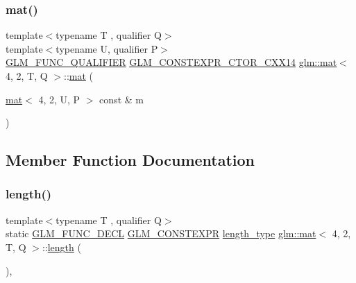 \mbox{\label{structglm_1_1mat_3_014_00_012_00_01_t_00_01_q_01_4_aee1461cf7e6bb89dcc9e2d387faef90b}} 
\subsubsection{\texorpdfstring{mat()}{mat()}\hspace{0.1cm}{\footnotesize\ttfamily [21/21]}}
{\footnotesize\ttfamily template$<$typename T , qualifier Q$>$ \\
template$<$typename U, qualifier P$>$ \\
\hyperlink{setup_8hpp_a33fdea6f91c5f834105f7415e2a64407}{G\+L\+M\+\_\+\+F\+U\+N\+C\+\_\+\+Q\+U\+A\+L\+I\+F\+I\+ER} \hyperlink{setup_8hpp_a0900f9145e68bf6061b6f5e7be3fa751}{G\+L\+M\+\_\+\+C\+O\+N\+S\+T\+E\+X\+P\+R\+\_\+\+C\+T\+O\+R\+\_\+\+C\+X\+X14} \hyperlink{structglm_1_1mat}{glm\+::mat}$<$ 4, 2, T, Q $>$\+::\hyperlink{structglm_1_1mat}{mat} (\begin{DoxyParamCaption}\item[{\hyperlink{structglm_1_1mat}{mat}$<$ 4, 2, U, P $>$ const \&}]{m }\end{DoxyParamCaption})}



\subsection{Member Function Documentation}
\mbox{\label{structglm_1_1mat_3_014_00_012_00_01_t_00_01_q_01_4_ab3b1d2d2d45c52698509f170c3e0d866}} 
\subsubsection{\texorpdfstring{length()}{length()}}
{\footnotesize\ttfamily template$<$typename T , qualifier Q$>$ \\
static \hyperlink{setup_8hpp_ab2d052de21a70539923e9bcbf6e83a51}{G\+L\+M\+\_\+\+F\+U\+N\+C\+\_\+\+D\+E\+CL} \hyperlink{setup_8hpp_a08b807947b47031d3a511f03f89645ad}{G\+L\+M\+\_\+\+C\+O\+N\+S\+T\+E\+X\+PR} \hyperlink{structglm_1_1mat_3_014_00_012_00_01_t_00_01_q_01_4_a4b192a2630331f70ca61657d9783026e}{length\+\_\+type} \hyperlink{structglm_1_1mat}{glm\+::mat}$<$ 4, 2, T, Q $>$\+::\hyperlink{_s_d_l__opengl__glext_8h_ab9c919755bde3b34349e23a32b4e0fa7}{length} (\begin{DoxyParamCaption}{ }\end{DoxyParamCaption})\hspace{0.3cm}{\ttfamily [inline]}, {\ttfamily [static]}}

